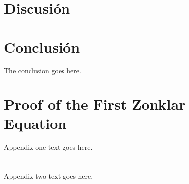 \documentclass[conference,onecolumn,10pt]{IEEEtran}
\begin{document}
\section{Discusión}

\section{Conclusión}
The conclusion goes here.


\appendices
\section{Proof of the First Zonklar Equation}
Appendix one text goes here.

\section{}
Appendix two text goes here.



%
%
%
\printbibliography
\end{document}
